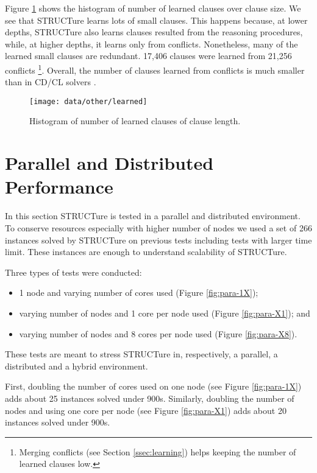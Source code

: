 Figure \ref{fig:num-learned} shows the histogram of number
of learned clauses over clause size. We see that STRUCTure learns lots
of small clauses. This happens because, at lower depths, STRUCTure
also learns clauses resulted from the reasoning procedures, while,
at higher depths, it learns only from conflicts. Nonetheless, many of
the learned small clauses are redundant. 17,406 clauses were learned
from 21,256 conflicts \footnote{Merging conflicts (see Section
\ref{ssec:learning}) helps keeping the number of learned clauses
low.}. Overall, the number of clauses learned from conflicts is much
smaller than in CD/CL solvers \cite{Marques-silva99grasp:a}.


\begin{figure}
  \centering
  \texttt{[image: data/other/learned]}
  \caption{Histogram of number of learned clauses of clause length.}
  \label{fig:num-learned}
\end{figure}



\section{Parallel and Distributed Performance}

In this section STRUCTure is tested in a parallel and distributed
environment. To conserve resources especially with higher number
of nodes we used a set of 266 instances solved by STRUCTure on
previous tests including tests with larger time limit. These instances
are enough to understand scalability of STRUCTure.

Three types of tests were conducted:
\begin{itemize}
  \item 1 node and varying number of cores used (Figure \ref{fig:para-1X});
  \item varying number of nodes and 1 core per node used (Figure \ref{fig:para-X1}); and
  \item varying number of nodes and 8 cores per node used (Figure \ref{fig:para-X8}).
\end{itemize}
These tests are meant to stress STRUCTure in, respectively, a
parallel, a distributed and a hybrid environment.

First, doubling the number of cores used on one node (see Figure
\ref{fig:para-1X}) adds about 25 instances solved under 900s.
Similarly, doubling the number of nodes and using one core per node
(see Figure \ref{fig:para-X1}) adds about 20 instances solved under 900s.

